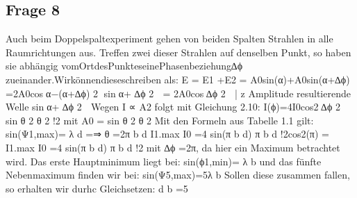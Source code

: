 \documentclass[a4paper,10pt]{scrartcl}
\begin{document}
		\subsection{Frage 8}
		Auch beim Doppelspaltexperiment gehen von beiden Spalten Strahlen in alle Raumrichtungen aus. Treﬀen zwei dieser Strahlen auf denselben Punkt, so haben sie abhängig vomOrtdesPunkteseinePhasenbeziehung∆ϕ zueinander.Wirkönnendieseschreiben als: E = E1 +E2 = A0sin(α)+A0sin(α+∆ϕ) =2A0cosα−(α+∆ϕ) 2 sinα+ ∆ϕ 2  = 2A0cos∆ϕ 2  | {z } Amplitude resultierende Welle sinα+ ∆ϕ 2  Wegen I ∝ A2 folgt mit Gleichung 2.10: I(ϕ)=4I0cos2∆ϕ 2  sin θ 2 θ 2 !2 mit A0 = sin θ 2 θ 2 Mit den Formeln aus Tabelle 1.1 gilt: sin(Ψ1,max)= λ d =⇒ θ =2π b d I1.max I0 =4 sin(π b d) π b d !2cos2(π) = I1.max I0 =4 sin(π b d) π b d !2 mit ∆ϕ =2π, da hier ein Maximum betrachtet wird. Das erste Hauptminimum liegt bei: sin(ϕ1,min)= λ b und das fünfte Nebenmaximum ﬁnden wir bei: sin(Ψ5,max)=5λ b Sollen diese zusammen fallen, so erhalten wir durhc Gleichsetzen:
d b
=5


		
	
\end{document}
